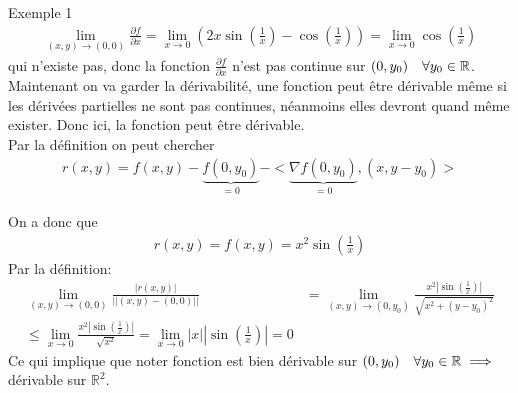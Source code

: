 \begin{parag}{Exemple 1}
\begin{align*}
         \lim_{\left(x, y\right) \to \left(0, 0\right)}  \frac{\partial f}{\partial x}  = \lim_{x \to 0} \left(2x \sin \left(\frac{1}{x}\right) - \cos \left(\frac{1}{x}\right)\right) = \lim_{x \to 0} \cos\left(\frac{1}{x}\right)
     \end{align*}
     qui n'existe pas, donc la fonction $\frac{\partial f}{\partial x} $ n'est pas continue sur $\left(0, y_0\right) \mathspace \forall y_0 \in \mathbb{R}$.\\
     Maintenant on va garder la dérivabilité, une fonction peut être dérivable même si les dérivées partielles ne sont pas continues, néanmoins elles devront quand même exister. Donc ici, la fonction peut être dérivable.\\
     Par la définition on peut chercher
     \begin{align*} r\left(x, y\right) =  f\left(x, y\right)  - \underbrace{ f\left(0, y_0\right) }_{ = 0}- < \underbrace{\nabla f \left(0, y_0\right)}_{ = 0},  \left(x, y - y_0\right)> \end{align*}
     
     On a donc que 
     \begin{align*} r\left(x, y\right) =  f\left(x, y\right) =  x^2\sin\left(\frac{1}{x}\right) \end{align*}
     Par la définition:
     \begin{align*} 
         \lim_{\left(x, y\right) \to \left(0, 0\right)} \frac{\left|r\left(x, y\right)\right|}{\left|\left|\left(x, y\right) - \left(0, 0\right)\right|\right|} &= \lim_{\left(x, y\right) \to \left(0, y_0\right)} \frac{x^2 \left|\sin\left(\frac{1}{x}\right)\right|}{\sqrt{x^2  + \left(y - y_0\right)^2}}\\
         \leq \lim_{x   \to 0} \frac{x^2 \left|\sin\left(\frac{1}{x}\right)\right|}{\sqrt{x^2}} =  \lim_{x \to 0} \left|x\right|\left|\sin\left(\frac{1}{x}\right)\right| = 0
     \end{align*}
     Ce qui implique que noter fonction est bien dérivable sur $\left(0, y_0\right) \mathspace \forall y_0 \in \mathbb{R} \implies $ dérivable sur $\mathbb{R}^{2}$.

\end{parag}

